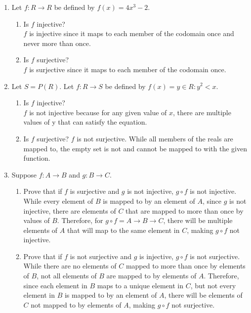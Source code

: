 \documentclass{article}
\begin{document}
\begin{enumerate}
\item Let $f: R \rightarrow R$ be defined by $f(x) = 4x^3-2$.
    \begin{enumerate}
    \item Is $f$ injective? \\
       $f$ is injective since it maps to each member of the codomain once and never more than once.  
    \item Is $f$ surjective? \\
       $f$ is surjective since it maps to each member of the codomain once.  
    \end{enumerate}
\item Let $S = P(R)$. Let $f: R \to S$ be defined by $f(x) = {y \in R: y^2 < x}$.
    \begin{enumerate}
    \item Is $f$ injective? \\
        $f$ is not injective because for any given value of $x$, there are multiple values of y that can satisfy the equation. 
    \item Is $f$ surjective?
        $f$ is not surjective. While all members of the reals are mapped to, the empty set is not and cannot be mapped to with the given function. 
    \end{enumerate}
\item Suppose $f: A \to B$ and $g: B \to C$. 
    \begin{enumerate}
    \item Prove that if $f$ is surjective and $g$ is not injective, $g \circ f$ is not injective. \\
        While every element of $B$ is mapped to by an element of $A$, since $g$ is not injective, there are elements of $C$ that are mapped to more than once by values of $B$. Therefore, for $g \circ f = A \to B \to C$, there will be multiple elements of $A$ that will map to the same element in $C$, making $g \circ f$ not injective.
    \item Prove that if $f$ is not surjective and $g$ is injective, $g \circ f$ is not surjective. \\
    While there are no elements of $C$ mapped to more than once by elements of $B$, not all elements of $B$ are mapped to by elements of $A$. Therefore, since each element in $B$ maps to a unique element in $C$, but not every element in $B$ is mapped to by an element of $A$, there will be elements of $C$ not mapped to by elements of $A$, making $g \circ f$ not surjective.
    \end{enumerate}

\end{enumerate}
\end{document}
